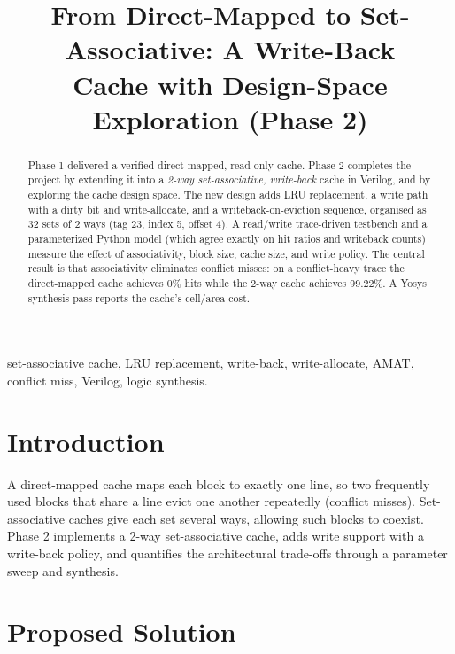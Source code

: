 \documentclass[conference]{IEEEtran}
\begin{document}
\title{From Direct-Mapped to Set-Associative: A Write-Back\\
Cache with Design-Space Exploration (Phase 2)}

\author{
\IEEEauthorblockA{[Roll No]}\and
{}\IEEEauthorblockA{[Roll No]}\and
{}\IEEEauthorblockA{[Roll No]}\and
{}\IEEEauthorblockA{[Roll No]}
}
\maketitle

\begin{abstract}
Phase 1 delivered a verified direct-mapped, read-only cache. Phase 2 completes
the project by extending it into a \emph{2-way set-associative, write-back}
cache in Verilog, and by exploring the cache design space. The new design adds
LRU replacement, a write path with a dirty bit and write-allocate, and a
writeback-on-eviction sequence, organised as 32 sets of 2 ways (tag 23, index
5, offset 4). A read/write trace-driven testbench and a parameterized Python
model (which agree exactly on hit ratios and writeback counts) measure the
effect of associativity, block size, cache size, and write policy. The central
result is that associativity eliminates conflict misses: on a conflict-heavy
trace the direct-mapped cache achieves 0\% hits while the 2-way cache achieves
99.22\%. A Yosys synthesis pass reports the cache's cell/area cost.
\end{abstract}

\begin{IEEEkeywords}
set-associative cache, LRU replacement, write-back, write-allocate, AMAT,
conflict miss, Verilog, logic synthesis.
\end{IEEEkeywords}

\section{Introduction}
A direct-mapped cache maps each block to exactly one line, so two frequently
used blocks that share a line evict one another repeatedly (conflict misses).
Set-associative caches give each set several ways, allowing such blocks to
coexist. Phase 2 implements a 2-way set-associative cache, adds write support
with a write-back policy, and quantifies the architectural trade-offs through a
parameter sweep and synthesis.

\section{Proposed Solution}
\end{document}
